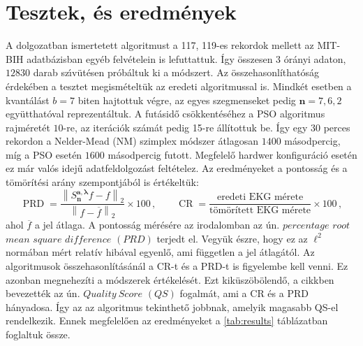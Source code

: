 \documentclass[oneside,titlepage,12pt,a4paper]{report}
\DeclareMathOperator{\PRD}{PRD}
\DeclareMathOperator{\CR}{CR}
\newcommand{\conj}[1]{\overline{#1}}
\begin{document}
\section{Tesztek, \'es eredm\'enyek}
\label{sec:test}
	A dolgozatban ismertetett algoritmust a 117, 119-es rekordok mellett az MIT-BIH adatb\'azisban egyéb felvételein is lefuttattuk. Így összesen $3$ órányi adaton, $12830$ darab sz\'\i v\"ut\'esen pr\'ob\'altuk ki a m\'odszert. Az összehasonlíthatóság érdekében a tesztet megismételtük az eredeti \cite{hexp3} algoritmussal is. Mindkét esetben a kvantálást $b=7$ biten hajtottuk végre, az egyes szegmenseket pedig $\mathbf{n}=7,6,2$ együtthatóval reprezentáltuk. A futásidő csökkentéséhez a PSO algoritmus rajméretét $10$-re, az iterációk számát pedig 15-re állítottuk be. Így egy $30$ perces rekordon a Nelder-Mead (NM) szimplex módszer átlagosan $1400$ másodpercig, míg a PSO esetén $1600$ másodpercig futott. Megfelelő hardwer konfiguráció esetén ez már valós idejű adatfeldolgozást feltételez. Az eredményeket a pontosság és a tömörítési arány szempontjából is értékeltük:
\begin{equation*}
		\PRD=\frac{\left\|S_{\mathbf{n}}^{\mathbf{a},\boldsymbol{\lambda}}f-f\right\|_2}{\left\|f-\conj{f}\right\|_2}\times 100\,,\qquad  \CR=\frac{\text{eredeti EKG mérete}}{\text{tömörített EKG mérete}}\times 100\,,
		\label{eq:prd_cr}
\end{equation*}
ahol $\conj{f}$ a jel átlaga. A pontosság mérésére az irodalomban az ún. $percentage$ $root$ $mean$ $square$ $difference$ $(PRD)$ terjedt el. Vegyük észre, hogy ez az $\ell^2$ normában mért relatív hibával egyenlő, ami független a jel átlagától. Az algoritmusok összehasonlításánál a CR-t és a PRD-t is figyelembe kell venni. Ez azonban megnehezíti a módszerek értékelését. Ezt kiküszöbölendő, a \cite{pkselect} cikkben bevezették az ún. $Quality\ Score$ $(QS)$ fogalmát, ami a CR és a PRD hányadosa. Így az az algoritmus tekinthető jobbnak, amelyik magasabb QS-el rendelkezik. Ennek megfelelően az eredményeket a \ref{tab:results} táblázatban foglaltuk össze.
\end{document}

